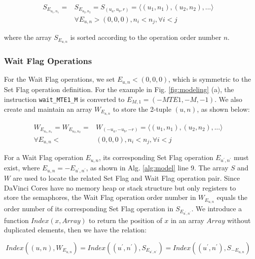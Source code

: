 \begin{equation}
\begin{aligned}
S_{E_{u_{1}, n_{1}}} = & S_{E_{u_{2}, n_{2}}} = S_{(u_{a}, u_{b}, r)} = \langle (u_{1}, n_{1}), (u_{2}, n_{2}), ... \rangle \\
& \forall E_{u, n} > (0, 0, 0), n_{i} < n_{j}, \forall i < j
\end{aligned}
\end{equation}

where the array $S_{E_{u, n}}$ is sorted according to the operation order number $n$.

\subsubsection{Wait Flag Operations}

For the Wait Flag operations, we set $E_{u, n} < (0, 0, 0)$, which is symmetric to the Set Flag operation definition. For the example in Fig. \ref{fig:modeling} (a), the instruction \verb|wait_MTE1_M| is converted to $E_{M, 1} = (-MTE1, -M, -1)$. We also create and maintain an array $W_{E_{u, n}}$ to store the 2-tuple $(u, n)$, as shown below:

\begin{equation}
\begin{aligned}
W_{E_{u_{1}, n_{1}}} = W_{E_{u_{2}, n_{2}}} = & W_{(-u_{a}, -u_{b}, -r)} = \langle (u_{1}, n_{1}), (u_{2}, n_{2}), ... \rangle \\
\forall E_{u, n} < & (0, 0, 0), n_{i} < n_{j}, \forall i < j
\end{aligned}
\end{equation}

For a Wait Flag operation $E_{u, n}$, its corresponding Set Flag operation $E_{u^{\prime}, n^{\prime}}$ must exist, where $E_{u, n} = - E_{u^{\prime}, n^{\prime}}$, as shown in Alg. \ref{alg:model} line 9. The array $S$ and $W$ are used to locate the related Set Flag and Wait Flag operation pair. Since DaVinci Cores have no memory heap or stack structure but only registers to store the semaphores, the Wait Flag operation order number in $W_{E_{u, n}}$ equals the order number of its corresponding Set Flag operation in $S_{E_{u^{\prime}, n^{\prime}}}$. We introduce a function $Index(x, Array)$ to return the position of $x$ in an array $Array$ without duplicated elements, then we have the relation:

\begin{equation}
Index((u, n), W_{E_{u, n}}) = 
    Index((u^{\prime}, n^{\prime}), S_{E_{u^{\prime}, n^{\prime}}}) = 
    Index((u^{\prime}, n^{\prime}), S_{- E_{u, n}})
\end{equation}

